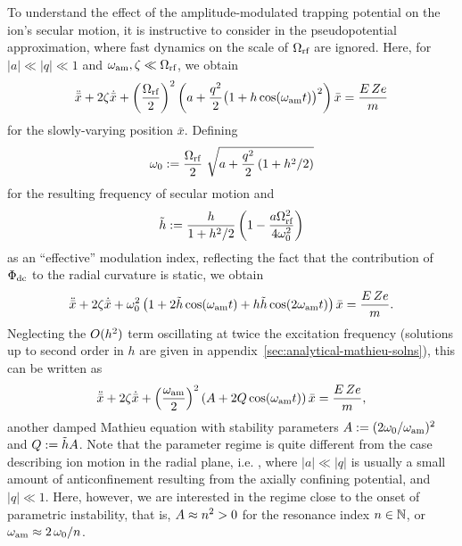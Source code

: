 \documentclass[pra,twocolumn]{revtex4-2}
\begin{document}
To understand the effect of the amplitude-modulated trapping potential on the ion's secular motion, it is instructive to consider  in the pseudopotential approximation, where fast dynamics on the scale of $\Omega_{\textrm{rf}}$ are ignored.
Here, for $|a| \ll |q| \ll 1$ and $\omega_{\textrm{am}}, \zeta \ll \Omega_{\textrm{rf}}$, we obtain
\begin{equation}
	\ddot{\bar{x}} + 2 \zeta \dot{\bar{x}} + \left(\frac{\Omega_{\textrm{rf}}}{2}\right)^2 \left(a + \frac{q^2}{2} \big(1 + h \cos(\omega_{\textrm{am}} t)\big)^2\right) \bar{x} = \frac{E\, Z e}{m}
\end{equation}
for the slowly-varying position $\bar{x}$. Defining
\begin{equation}
	\omega_{\textrm{0}} := \frac{\Omega_{\textrm{rf}}}{2}\ \sqrt{a + \frac{q^2}{2} \left(1 + h^2 / 2\right)} \label{eq:pseudopot-modefreq}
\end{equation}
for the resulting frequency of secular motion and
\begin{equation}
	\tilde{h} := \frac{h}{1 + h^2 / 2} \left(1 - \frac{a \Omega_{\textrm{rf}}^2}{4 \omega_{\textrm{0}}^2}\right)
\end{equation}
as an \enquote{effective} modulation index, reflecting the fact that the contribution of $\Phi_{\textrm{dc}}$ to the radial curvature is static, we obtain
\begin{equation}
	\ddot{\bar{x}} + 2 \zeta \dot{\bar{x}} + \omega_{\textrm{0}}^2 \left(1 + 2 \tilde{h} \cos(\omega_{\textrm{am}} t) + h \tilde{h} \cos(2 \omega_{\textrm{am}} t) \right) \bar{x} = \frac{E\, Z e}{m}.
	\label{eq:pseudopotential-damped}
\end{equation}
Neglecting the $O(h^2)$ term oscillating at twice the excitation frequency (solutions up to second order in $h$ are given in appendix~\ref{sec:analytical-mathieu-solns}), this can be written as
\begin{equation}
	\ddot{\bar{x}} + 2 \zeta \dot{\bar{x}} + \left(\frac{\omega_{\textrm{am}}}{2}\right)^2 \left(A + 2 Q \cos(\omega_{\textrm{am}} t)\right) \bar{x} = \frac{E\, Z e}{m},
	\label{eq:pseudopotential-damped-mathieu}
\end{equation}
another damped Mathieu equation with stability parameters $A := (2 \omega_{\textrm{0}} / \omega_{\textrm{am}})^2$ and $Q := \tilde{h} A$. Note that the parameter regime is quite different from the case describing ion motion in the radial plane, i.e. , where $|a| \ll |q|$ is usually a small amount of anticonfinement resulting from the axially confining \DC{} potential, and $|q| \ll 1$.
Here, however, we are interested in the regime close to the onset of parametric instability, that is, $A \approx n^2 > 0$ for the resonance index $n \in \mathbb{N}$, or $\omega_{\textrm{am}} \approx 2\, \omega_{\textrm{0}} / n$.
\end{document}
